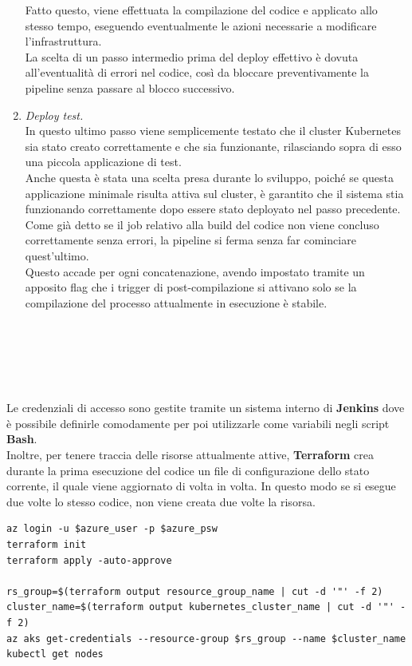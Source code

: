 \documentclass[a4paper,12pt]{report}
\begin{document}
\begin{enumerate}
Fatto questo, viene effettuata la compilazione del codice e applicato allo stesso tempo, eseguendo eventualmente le azioni necessarie a modificare l'infrastruttura.\\
La scelta di un passo intermedio prima del deploy effettivo è dovuta all'eventualità di errori nel codice, così da bloccare preventivamente la pipeline senza passare al blocco successivo.\\
\item \textit{Deploy test.} \\
In questo ultimo passo viene semplicemente testato che il cluster Kubernetes sia stato creato correttamente e che sia funzionante, rilasciando sopra di esso una piccola applicazione di test.\\
Anche questa è stata una scelta presa durante lo sviluppo, poiché se questa applicazione minimale risulta attiva sul cluster, è garantito che il sistema stia funzionando correttamente dopo essere stato deployato nel passo precedente.
Come già detto se il job relativo alla build del codice non viene concluso correttamente senza errori, la pipeline si ferma senza far cominciare quest'ultimo.\\
Questo accade per ogni concatenazione, avendo impostato tramite un apposito flag che i trigger di post-compilazione si attivano solo se la compilazione del processo attualmente in esecuzione è stabile.\\ \\ \\ \\ \\ \\
\end{enumerate}
Le credenziali di accesso sono gestite tramite un sistema interno di \textbf{Jenkins} dove è possibile definirle comodamente per poi utilizzarle come variabili negli script \textbf{Bash}.\\
Inoltre, per tenere traccia delle risorse attualmente attive, \textbf{Terraform} crea durante la prima esecuzione del codice un file di configurazione dello stato corrente, il quale viene aggiornato di volta in volta. In questo modo se si esegue due volte lo stesso codice, non viene creata due volte la risorsa.
\begin{lstlisting}[caption={\\\textit{Frammento di codice relativo alla compilazione del codice Terraform.\\ Nelle ultime righe viene effettuato un collegamento con il cluster appena creato e lanciato un comando per visualizzare i nodi in modo da accertarsi che sia operativo.}}]
az login -u $azure_user -p $azure_psw
terraform init
terraform apply -auto-approve 

rs_group=$(terraform output resource_group_name | cut -d '"' -f 2)
cluster_name=$(terraform output kubernetes_cluster_name | cut -d '"' -f 2)
az aks get-credentials --resource-group $rs_group --name $cluster_name
kubectl get nodes
\end{lstlisting}
\end{document}
